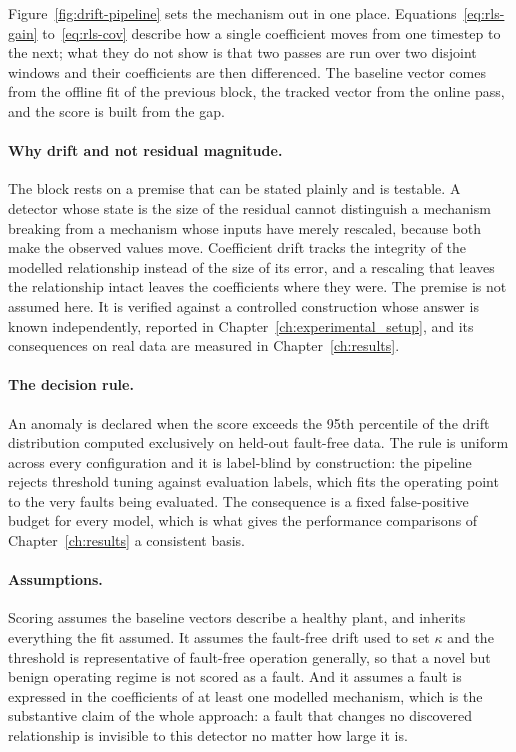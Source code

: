 Figure~\ref{fig:drift-pipeline} sets the mechanism out in one place. Equations~\ref{eq:rls-gain} to~\ref{eq:rls-cov} describe how a single coefficient moves from one timestep to the next; what they do not show is that two passes are run over two disjoint windows and their coefficients are then differenced. The baseline vector comes from the offline fit of the previous block, the tracked vector from the online pass, and the score is built from the gap.

\paragraph{Why drift and not residual magnitude.} The block rests on a premise that can be stated plainly and is testable. A detector whose state is the size of the residual cannot distinguish a mechanism breaking from a mechanism whose inputs have merely rescaled, because both make the observed values move. Coefficient drift tracks the integrity of the modelled relationship instead of the size of its error, and a rescaling that leaves the relationship intact leaves the coefficients where they were. The premise is not assumed here. It is verified against a controlled construction whose answer is known independently, reported in Chapter~\ref{ch:experimental_setup}, and its consequences on real data are measured in Chapter~\ref{ch:results}.

\paragraph{The decision rule.} An anomaly is declared when the score exceeds the 95th percentile of the drift distribution computed exclusively on held-out fault-free data. The rule is uniform across every configuration and it is label-blind by construction: the pipeline rejects threshold tuning against evaluation labels, which fits the operating point to the very faults being evaluated. The consequence is a fixed false-positive budget for every model, which is what gives the performance comparisons of Chapter~\ref{ch:results} a consistent basis.

\paragraph{Assumptions.} Scoring assumes the baseline vectors describe a healthy plant, and inherits everything the fit assumed. It assumes the fault-free drift used to set $\kappa$ and the threshold is representative of fault-free operation generally, so that a novel but benign operating regime is not scored as a fault. And it assumes a fault is expressed in the coefficients of at least one modelled mechanism, which is the substantive claim of the whole approach: a fault that changes no discovered relationship is invisible to this detector no matter how large it is.

